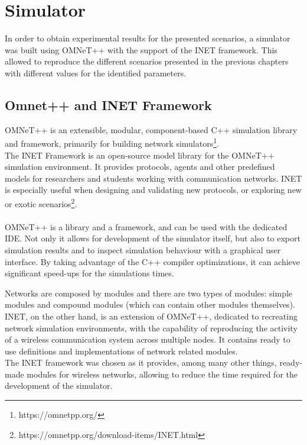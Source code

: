%
\chapter{Simulator}\label{ch:simulator}
In order to obtain experimental results for the presented scenarios, a simulator
was built using OMNeT++ with the support of the INET framework. This allowed
to reproduce the different scenarios presented in the previous chapters with
different values for the identified parameters.\\
\section{Omnet++ and INET Framework}
OMNeT++ is an extensible, modular, component-based C++ simulation library and
framework, primarily for building network simulators\footnote{https://omnetpp.org/}.\\
The INET Framework is an open-source model library for the OMNeT++ simulation
environment. It provides protocols, agents and other predefined models for
researchers and students working with communication networks. INET is especially
useful when designing and validating new protocols, or exploring new or exotic
scenarios\footnote{https://omnetpp.org/download-items/INET.html}.\\
\\
OMNeT++ is a library and a framework, and can be used with the dedicated IDE.
Not only it allows for development of the simulator itself, but also to export
simulation results and to inspect simulation behaviour with a graphical user
interface. By taking advantage of the C++ compiler optimizations, it can achieve significant speed-ups for the simulations times.

Networks are composed by modules and there are two
types of modules: simple modules and compound modules (which can contain other
modules themselves).
INET, on the other hand, is an extension of OMNeT++, dedicated to recreating 
network simulation environments, with the capability of reproducing the activity
of a wireless communication system across multiple nodes. It contains ready to
use definitions and implementations of network related modules.\\
The INET framework was chosen as it provides, among many other things, ready-made modules for wireless networks, allowing to reduce the time required for the development of the simulator.
